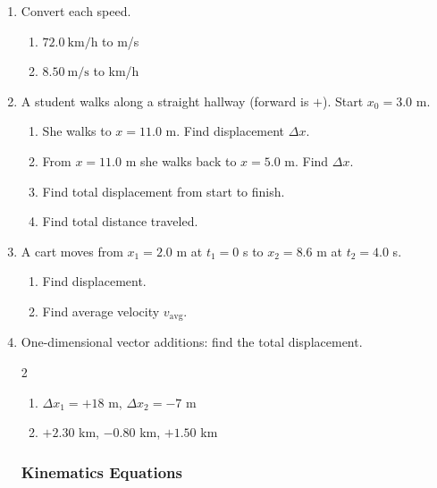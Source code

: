 \documentclass[12pt, twoside]{article}
\begin{document}
\begin{enumerate}[itemsep=0.75cm]
\item Convert each speed.
  \begin{enumerate}[itemsep=2cm]
    \item $72.0~\text{km/h}$ to m/s
    \item $8.50~\text{m/s}$ to km/h
  \end{enumerate}
  \vspace{1cm}

\newpage
\item A student walks along a straight hallway (forward is $+$). Start $x_0 = 3.0$ m.
  \begin{enumerate}[itemsep=1.25cm]
    \item She walks to $x = 11.0$ m. Find displacement $\Delta x$.
    \item From $x=11.0$ m she walks back to $x=5.0$ m. Find $\Delta x$.
    \item Find total displacement from start to finish.
    \item Find total distance traveled.
  \end{enumerate}
  \vspace{1cm}

\item A cart moves from $x_1 = 2.0$ m at $t_1=0$ s to $x_2 = 8.6$ m at $t_2 = 4.0$ s.
  \begin{enumerate}[itemsep=1.25cm]
    \item Find displacement.
    \item Find average velocity $v_\text{avg}$.
  \end{enumerate}
  \vspace{1cm}

\item One-dimensional vector additions: find the total displacement.
  \begin{multicols}{2}
  \begin{enumerate}[itemsep=1.5cm]
    \item $\Delta x_1 = +18$ m, $\Delta x_2 = -7$ m
    \item $+2.30$ km, $-0.80$ km, $+1.50$ km
  \end{enumerate}
  \end{multicols}
  \vspace{1.5cm}

\newpage
\subsubsection*{Kinematics Equations}


\end{enumerate}
\end{document}
